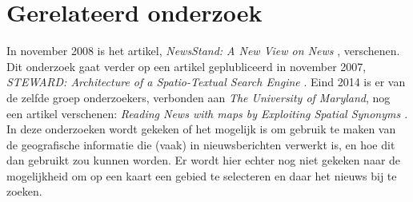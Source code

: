\documentclass[twoside,openright]{uva-bachelor-thesis}
\begin{document}
\chapter{Gerelateerd onderzoek}
	\label{ch:related}
	In november 2008 is het artikel, \textit{NewsStand: A New View on News} \cite{NewsStand2008}, verschenen. Dit onderzoek gaat verder op een artikel geplubliceerd in november 2007, \textit{STEWARD: Architecture of a Spatio-Textual Search Engine} \cite{STEWARD}. Eind 2014 is er van de zelfde groep onderzoekers, verbonden aan \textit{The University of Maryland}, nog een artikel verschenen: \textit{Reading News with maps by Exploiting Spatial Synonyms \cite{RNwMbESS}}. In deze onderzoeken wordt gekeken of het mogelijk is om gebruik te maken van de geografische informatie die (vaak) in nieuwsberichten verwerkt is, en hoe dit dan gebruikt zou kunnen worden. Er wordt hier echter nog niet gekeken naar de mogelijkheid om op een kaart een gebied te selecteren en daar het nieuws bij te zoeken.
\end{document}
